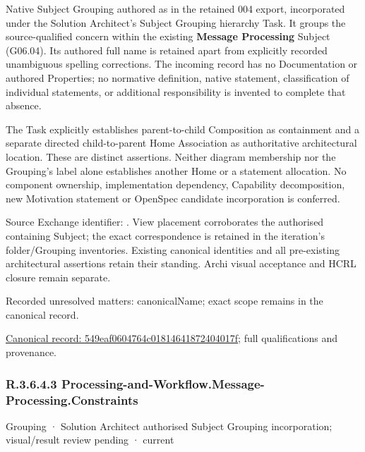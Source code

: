 Native Subject Grouping authored as \texttt{} in the retained 004 export,
incorporated under the Solution Architect's Subject Grouping hierarchy Task.
It groups the source-qualified \texttt{} concern within
the existing \textbf{Message Processing} Subject (G06.04). Its authored full name
is retained apart from explicitly recorded unambiguous spelling corrections.
The incoming record has no Documentation or authored Properties; no normative
definition, native statement, classification of individual statements, or
additional responsibility is invented to complete that absence.



The Task explicitly establishes parent-to-child Composition as containment and
a separate directed child-to-parent Home Association as authoritative architectural
location. These are distinct assertions. Neither diagram membership nor the
Grouping's label alone establishes another Home or a statement allocation.
No component ownership, implementation dependency, Capability decomposition,
new Motivation statement or OpenSpec candidate incorporation is conferred.



Source Exchange identifier: \texttt{}. View placement corroborates
the authorised containing Subject; the exact correspondence is retained in the
iteration's folder/Grouping inventories. Existing canonical identities and all
pre-existing architectural assertions retain their standing. Archi visual
acceptance and HCRL closure remain separate.


{\small Recorded unresolved matters: canonicalName; exact scope remains in the canonical record.}\par
{\footnotesize \href{../../../../continuum/grouping/549eaf0604764c01814641872404017f.md}{Canonical record: 549eaf0604764c01814641872404017f}; full qualifications and provenance.}\par
\subsubsection*{R.3.6.4.3 Processing-and-Workflow.Message-Processing.Constraints}
\label{navigation:R.3.6.4.3}

\label{element:99e7cebde18640df841ac7f5c0c996be}
{\small Grouping · Solution Architect authorised Subject Grouping incorporation; visual/result review pending · current}\par

